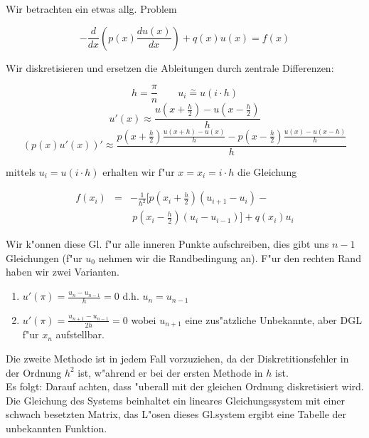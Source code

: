 \documentclass[german, 10pt, a4paper, twocolumn]{scrartcl}
\theoremstyle{definition}
\begin{document}
Wir betrachten ein etwas allg. Problem

\begin{displaymath}
	- \frac{d}{dx}\left ( p(x) \frac{du(x)}{dx} \right ) + q(x) u(x) = f(x)
\end{displaymath}

Wir diskretisieren und ersetzen die Ableitungen durch zentrale Differenzen:

\begin{displaymath}
	h = \frac{\pi}{n} \qquad u_i \overset{\sim}{=} u(i\cdotp h)
\end{displaymath}
\begin{displaymath}
	u'(x) \approx \frac{u(x+\frac{h}{2}) - u(x - \frac{h}{2})}{h}
\end{displaymath}
\begin{displaymath}
	(p(x)u'(x))' \approx \frac{p(x+\frac{h}{2})\frac{u(x+h) - u(x)}{h} - p(x-\frac{h}{2}) \frac{u(x) - u(x-h)}{h} }{h}
\end{displaymath}

mittels $u_i = u(i\cdotp h)$ erhalten wir f"ur $x=x_i = i \cdotp h$ die Gleichung

\begin{eqnarray*}
	f(x_i) &	= &	-\frac{1}{h^2}[p(x_i + \frac{h}{2})(u_{i+1} - u_i) - \\
	&		&	\ p(x_i - \frac{h}{2})(u_i - u_{i-1})] + q(x_i)u_i
\end{eqnarray*}

Wir k"onnen diese Gl. f"ur alle inneren Punkte aufschreiben, dies gibt uns $n-1$ Gleichungen (f"ur $u_0$ nehmen wir die Randbedingung an). F"ur den rechten Rand haben wir zwei Varianten.

\begin{enumerate}
	\item $u'(\pi) = \frac{u_n - u_{n-1}}{h}= 0$ d.h. $u_n = u_{n-1}$
	\item $u'(\pi) = \frac{u_{n+1} - u_{n-1}}{2h} = 0$ wobei $u_{n+1}$ eine zus"atzliche Unbekannte, aber DGL f"ur $x_n$ aufstellbar.
\end{enumerate}

Die zweite Methode ist in jedem Fall vorzuziehen, da der Diskretitionsfehler in der Ordnung $h^2$ ist, w"ahrend er bei der ersten Methode in $h$ ist.\\

Es folgt: Darauf achten, dass "uberall mit der gleichen Ordnung diskretisiert wird.\\

Die Gleichung des Systems beinhaltet ein lineares Gleichungssystem mit einer schwach besetzten Matrix, das L"osen dieses Gl.system ergibt eine Tabelle der unbekannten Funktion.
\end{document}
